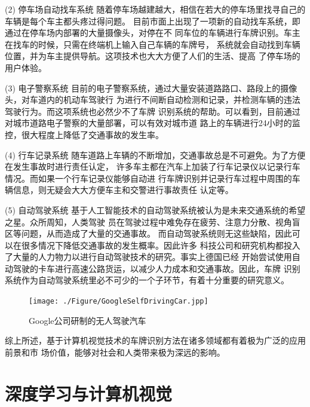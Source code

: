 (2) 停车场自动找车系统
随着停车场越建越大，相信在若大的停车场里找寻自己的车辆是每个车主都头疼过得问题。
目前市面上出现了一项新的自动找车系统，即通过在停车场内部署的大量摄像头，对停在不
同车位的车辆进行车牌识别。车主在找车的时候，只需在终端机上输入自己车辆的车牌号，
系统就会自动找到车辆位置，并为车主提供导航。这项技术也大大方便了人们的生活、提高
了停车场的用户体验。

(3) 电子警察系统
目前的电子警察系统，通过大量安装道路路口、路段上的摄像头，对车道内的机动车驾驶行
为进行不间断自动检测和记录，并检测车辆的违法驾驶行为。而这项系统也必然少不了车牌
识别系统的帮助。可以看到，目前通过对城市道路电子警察的大量部署，可以有效对城市道
路上的车辆进行24小时的监控，很大程度上降低了交通事故的发生率。

(4) 行车记录系统
随车道路上车辆的不断增加，交通事故总是不可避免。为了方便在发生事故时进行责任认定，
许多车主都在汽车上加装了行车记录仪以记录行车情况。而如果一个行车记录仪能够自动进
行车牌识别并记录行车过程中周围的车辆信息，则无疑会大大方便车主和交警进行事故责任
认定等。

(5) 自动驾驶系统
基于人工智能技术的自动驾驶系统被认为是未来交通系统的希望之星。众所周知，人类驾驶
员在驾驶过程中难免存在疲劳、注意力分散、视角盲区等问题，从而造成了大量的交通事故。
而自动驾驶系统则无这些缺陷，因此可以在很多情况下降低交通事故的发生概率。因此许多
科技公司和研究机构都投入了大量的人力物力以进行自动驾驶技术的研究。事实上德国已经
开始尝试使用自动驾驶的卡车进行高速公路货运，以减少人力成本和交通事故。因此，车牌
识别系统作为自动驾驶系统里必不可少的一个子环节，有着十分重要的研究意义。

\begin{figure}[ht]
  \centering
  \texttt{[image: ./Figure/GoogleSelfDrivingCar.jpp]}
  \caption{Google公司研制的无人驾驶汽车}
\end{figure}

综上所述，基于计算机视觉技术的车牌识别方法在诸多领域都有着极为广泛的应用前景和市
场价值，能够对社会和人类带来极为深远的影响。

\section{深度学习与计算机视觉}
